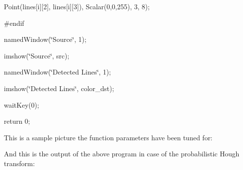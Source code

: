 {\ttfamily }

{\ttfamily }

{\ttfamily Point(lines\mbox{[}i\mbox{]}\mbox{[}2\mbox{]}, lines\mbox{[}i\mbox{]}\mbox{[}3\mbox{]}), Scalar(0,0,255), 3, 8);}

{\ttfamily }

{\ttfamily }

{\ttfamily \#endif}

{\ttfamily }

{\ttfamily }

{\ttfamily named\+Window(\char`\"{}\+Source\char`\"{}, 1);}

{\ttfamily }

{\ttfamily }

{\ttfamily imshow(\char`\"{}\+Source\char`\"{}, src);}

{\ttfamily }

{\ttfamily }

{\ttfamily named\+Window(\char`\"{}\+Detected Lines\char`\"{}, 1);}

{\ttfamily }

{\ttfamily }

{\ttfamily imshow(\char`\"{}\+Detected Lines\char`\"{}, color\+\_\+dst);}

{\ttfamily }

{\ttfamily }

{\ttfamily wait\+Key(0);}

{\ttfamily }

{\ttfamily }

{\ttfamily return 0;}

{\ttfamily }

{\ttfamily }

{\ttfamily This is a sample picture the function parameters have been tuned for\+: }

And this is the output of the above program in case of the probabilistic Hough transform\+:


